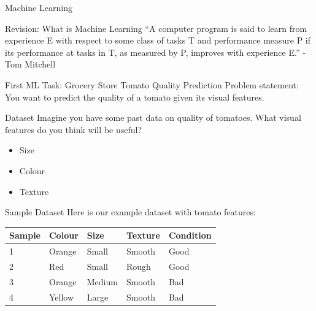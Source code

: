 \documentclass[usenames,dvipsnames]{beamer}
\begin{document}
\begin{frame}{Machine Learning}
\end{frame}

\begin{frame}{Revision: What is Machine Learning}
``A computer program is said to learn from
experience E with respect to some class of tasks T
and performance measure P if its performance at
tasks in T, as measured by P, improves with
experience E.'' - Tom Mitchell
\end{frame}

\begin{frame}{First ML Task: Grocery Store Tomato Quality Prediction}
Problem statement: You want to predict the quality of a tomato given its visual features.
\end{frame}

\begin{frame}{Dataset}
Imagine you have some past data on quality of tomatoes. What visual features do you think will be useful?

\begin{itemize}
	\item \pause Size
	\item \pause Colour
	\item \pause Texture
\end{itemize}
\end{frame}

\begin{frame}{Sample Dataset}
Here is our example dataset with tomato features: 

\begin{table}[]
	\begin{tabular}{|l|l|l|l||l|}
		\hline 
		\textbf{Sample} & \textbf{Colour} & \textbf{Size} & \textbf{Texture} & \textbf{Condition} \\ \hline 
		1      & Orange & Small & Smooth  & Good      \\
		2      & Red    & Small  & Rough  & Good \\
		3      & Orange & Medium & Smooth & Bad \\
		4      & Yellow & Large  & Smooth & Bad \\ \hline          
	\end{tabular}
\end{table}
\end{frame}
\end{document}
